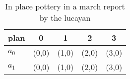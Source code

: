 \documentclass[a4paper]{article}
\begin{document}
\begin{table}
\begin{adjustbox}{width=0.8\columnwidth}
\begin{tabular}{|l|l|l|l|l|}
\hline
\textbf{plan} & \multicolumn{1}{c|}{\textbf{0}} & \multicolumn{1}{c|}{\textbf{1}} & \multicolumn{1}{c|}{\textbf{2}} & \multicolumn{1}{c|}{\textbf{3}} \\ \hline
\textbf{$a_0$}  & (0,0) & (1,0) & (2,0) & (3,0) \\ \hline
\textbf{$a_1$}  & (0,0) & (1,0) & (2,0) & (3,0) \\ \hline
\end{tabular}
\end{adjustbox}
\caption{In place pottery in a march report by the lucayan
}
\end{table}
\end{document}
